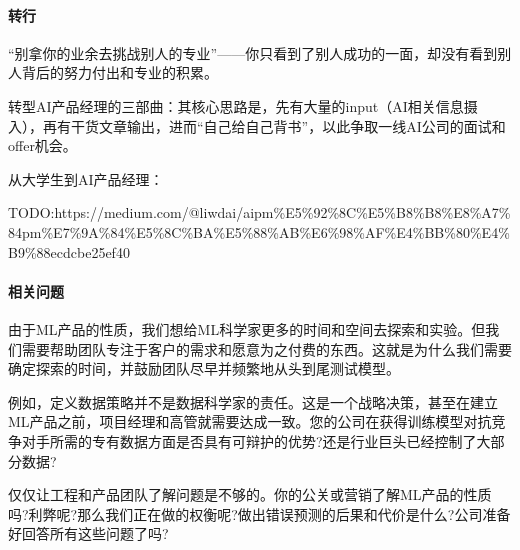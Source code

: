 \documentclass[letterpaper,11pt,english]{sphinxmanual}
\begin{document}
\paragraph{转行}
\label{\detokenize{chapter_introduction/AI_PM:id43}}
“别拿你的业余去挑战别人的专业”——你只看到了别人成功的一面，却没有看到别人背后的努力付出和专业的积累。%
\begin{footnote}[268]\sphinxAtStartFootnote
{}
%
\end{footnote}

转型AI产品经理的三部曲：其核心思路是，先有大量的input（AI相关信息摄入），再有干货文章输出，进而“自己给自己背书”，以此争取一线AI公司的面试和offer机会。

从大学生到AI产品经理：

TODO:https://medium.com/@liwdai/ai\sphinxhyphen{}pm\sphinxhyphen{}\%E5\%92\%8C\%E5\%B8\%B8\%E8\%A7\%84\sphinxhyphen{}pm\sphinxhyphen{}\%E7\%9A\%84\%E5\%8C\%BA\%E5\%88\%AB\%E6\%98\%AF\%E4\%BB\%80\%E4\%B9\%88\sphinxhyphen{}ecdcbe25ef40


\paragraph{相关问题}
\label{\detokenize{chapter_introduction/AI_PM:awesome-1}}\label{\detokenize{chapter_introduction/AI_PM:id44}}
由于ML产品的性质，我们想给ML科学家更多的时间和空间去探索和实验。但我们需要帮助团队专注于客户的需求和愿意为之付费的东西。这就是为什么我们需要确定探索的时间，并鼓励团队尽早并频繁地从头到尾测试模型。

例如，定义数据策略并不是数据科学家的责任。这是一个战略决策，甚至在建立ML产品之前，项目经理和高管就需要达成一致。您的公司在获得训练模型对抗竞争对手所需的专有数据方面是否具有可辩护的优势?还是行业巨头已经控制了大部分数据?

仅仅让工程和产品团队了解问题是不够的。你的公关或营销了解ML产品的性质吗?利弊呢?那么我们正在做的权衡呢?做出错误预测的后果和代价是什么?公司准备好回答所有这些问题了吗?
%
\begin{footnote}[269]\sphinxAtStartFootnote
{}
%
\end{footnote}
\end{document}
